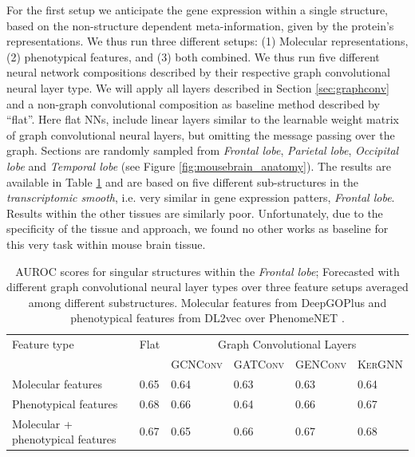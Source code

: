 \documentclass[]{article}
\renewcommand{\cite}{\citep}
\begin{document}
For the first setup we anticipate the gene expression within a single structure, based on the non-structure dependent meta-information, given by the protein's representations. We thus run three different setups: (1) Molecular representations, (2) phenotypical features, and (3) both combined. We thus run five different neural network compositions described by their respective graph convolutional neural layer type. We will apply all layers described in Section \ref{sec:graphconv} and a non-graph convolutional composition as baseline method described by ``flat''. Here flat NNs, include linear layers similar to the learnable weight matrix of graph convolutional neural layers, but omitting the message passing over the graph. Sections are randomly sampled from \textit{Frontal lobe}, \textit{Parietal lobe}, \textit{Occipital lobe} and \textit{Temporal lobe} (see Figure \ref{fig:mousebrain_anatomy}). The results are available in Table \ref{tab:geneexp_pred} and are based on five different sub-structures in the \textit{transcriptomic smooth}, i.e. very similar in gene expression patters, \textit{Frontal lobe}. Results within the other tissues are similarly poor. Unfortunately, due to the specificity of the tissue and approach, we found no other works as baseline for this very task within mouse brain tissue.

\begin{table}
	\centering
	\renewcommand{\arraystretch}{1.5}
	\begin{tabular}{|l|l|llll|}
		\hline
		Feature type&Flat&\multicolumn{4}{|c}{Graph Convolutional Layers}\\
		&&\multicolumn{1}{|l}{\textsc{GCNConv}}&\textsc{GATConv}&\textsc{GENConv}&\textsc{KerGNN}\\
		\hline
		Molecular features&0.65&0.64&0.63&0.63&0.64\\
		Phenotypical features&0.68&0.66&0.64&0.66&0.67\\
		Molecular + phenotypical features &0.67&0.65&0.66&0.67&0.68\\
		\hline
	\end{tabular}

	\caption[AUROC scores for singular structures within the \textit{Frontal lobe}]{AUROC scores for singular structures within the \textit{Frontal lobe}; Forecasted with different graph convolutional neural layer types over three feature setups averaged among different substructures. Molecular features from DeepGOPlus \cite{DeepGoPlus} and phenotypical features from DL2vec \cite{DL2vec2020} over PhenomeNET \cite{PhenomeNET2011}. }
	\label{tab:geneexp_pred}
\end{table}
\end{document}
